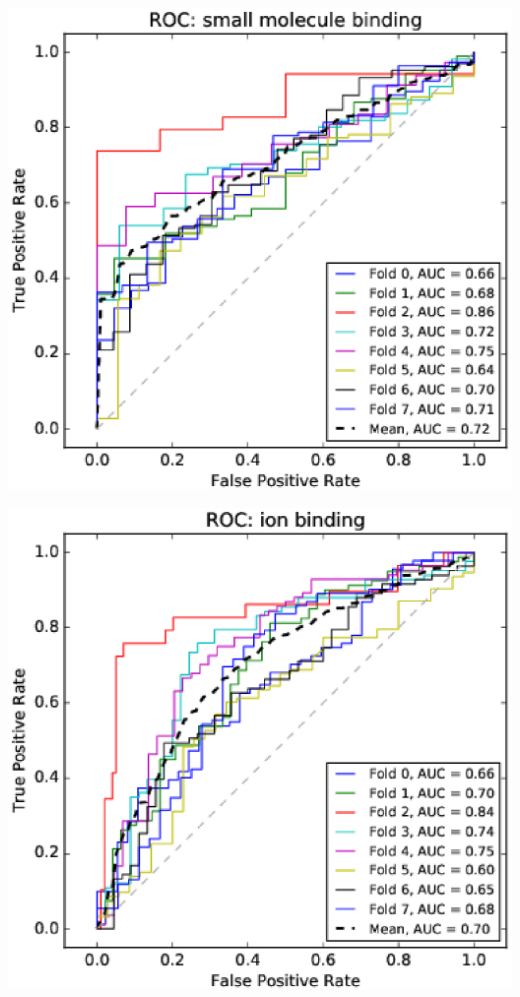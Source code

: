 \documentclass[11pt,twoside,a4paper]{book}
\newenvironment{Figure}
  {\par\medskip\noindent\minipage{\linewidth}}
  {\endminipage\par\medskip}
\begin{document}
\begin{multicols}{2}
\begin{Figure}\begin{center}\includegraphics[width=\linewidth]{figures/roc_small_molecule_binding}\label{fig:roc_small_molecule_binding}\end{center}\end{Figure}
\begin{Figure}\begin{center}\includegraphics[width=\linewidth]{figures/roc_ion_binding}\label{fig:roc_ion_binding}\end{center}\end{Figure}

\end{multicols}
\end{document}
